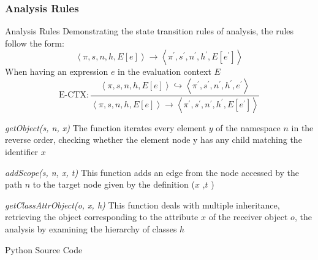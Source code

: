\documentclass[9pt, xcolor=table]{beamer}
\begin{document}
\subsubsection{Analysis Rules}
\begin{frame}{Analysis Rules}
	Demonstrating the state transition rules of analysis, the rules follow the form:
	\begin{equation}
		\left\langle \pi, s, n, h, E\left[e\right] \right\rangle \rightarrow \left\langle \pi^{'},  s^{'}, n^{'}, h^{'}, E\left[e^{'}\right] \right\rangle 
	\end{equation}\label{equ:state}
	When having an expression $e$ in the evaluation context $E$
	\begin{equation}
		\text{E-CTX} : \frac{\left\langle \pi, s, n, h, E\left[e\right] \right\rangle \hookrightarrow \left\langle \pi^{'},  s^{'}, n^{'}, h^{'}, e^{'} \right\rangle}
		{\left\langle \pi, s, n, h, E\left[e\right] \right\rangle \rightarrow \left\langle \pi^{'},  s^{'}, n^{'}, h^{'}, E\left[e^{'}\right] \right\rangle }
	\end{equation}\label{equ:E-CTX}
	\vfill
	\begin{block}{\textit{getObject(s, n, x)}}
		The function iterates every element $y$ of the namespace $n$ in the reverse order, checking whether the element node y has
		any child matching the identifier $x$
	\end{block}
	\begin{exampleblock}{\textit{addScope(s, n, x, t)}}
		This function adds an edge from the node accessed by the path $n$ to the target node given by
		the definition ($x$ ,$t$ )
	\end{exampleblock}
	\begin{alertblock}{\textit{getClassAttrObject(o, x, h)}}
		This function deals with multiple inheritance, retrieving the object corresponding
		to the attribute $x$ of the receiver object $o$, the analysis by examining the hierarchy of classes $h$ 	
	\end{alertblock}
\end{frame}
%
\begin{frame}{Python Source Code}
	\begin{columns}[totalwidth=\linewidth]
		\begin{column}{0.5\columnwidth}
			\begin{center}
				
			\end{center}
		\end{column}
		\begin{column}{0.5\columnwidth}
			\begin{center}
				
			\end{center}
		\end{column}
	\end{columns}
\end{frame}
\end{document}
